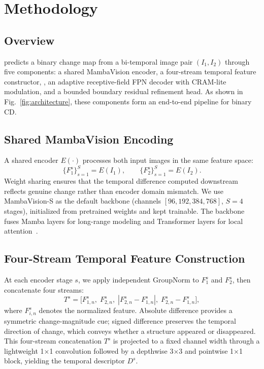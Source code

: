 \section{Methodology}
\label{sec:method}

\subsection{Overview}
\ours{} predicts a binary change map from a bi-temporal image pair $(I_1, I_2)$ through five components: a shared MambaVision encoder, a four-stream temporal feature constructor, \drbi, an adaptive receptive-field FPN decoder with CRAM-lite modulation, and a bounded boundary residual refinement head. As shown in Fig.~\ref{fig:architecture}, these components form an end-to-end pipeline for binary CD.



\subsection{Shared MambaVision Encoding}
A shared encoder $E(\cdot)$ processes both input images in the same feature space:
\begin{equation}
    \{F_1^s\}_{s=1}^{S} = E(I_1), \qquad \{F_2^s\}_{s=1}^{S} = E(I_2).
\end{equation}
Weight sharing ensures that the temporal difference computed downstream reflects genuine change rather than encoder domain mismatch. We use MambaVision-S as the default backbone (channels $[96, 192, 384, 768]$, $S=4$ stages), initialized from pretrained weights and kept trainable. The backbone fuses Mamba layers for long-range modeling and Transformer layers for local attention~\cite{hatamizadeh2025mambavision}.

\subsection{Four-Stream Temporal Feature Construction}
At each encoder stage $s$, we apply independent GroupNorm to $F_1^s$ and $F_2^s$, then concatenate four streams:
\begin{equation}
    T^s = \bigl[F_{1,n}^s,\; F_{2,n}^s,\; |F_{2,n}^s - F_{1,n}^s|,\; F_{2,n}^s - F_{1,n}^s\bigr],
\end{equation}
where $F_{i,n}^s$ denotes the normalized feature. Absolute difference provides a symmetric change-magnitude cue; signed difference preserves the temporal direction of change, which conveys whether a structure appeared or disappeared. This four-stream concatenation $T^s$ is projected to a fixed channel width through a lightweight 1$\times$1 convolution followed by a depthwise 3$\times$3 and pointwise 1$\times$1 block, yielding the temporal descriptor $D^s$.

